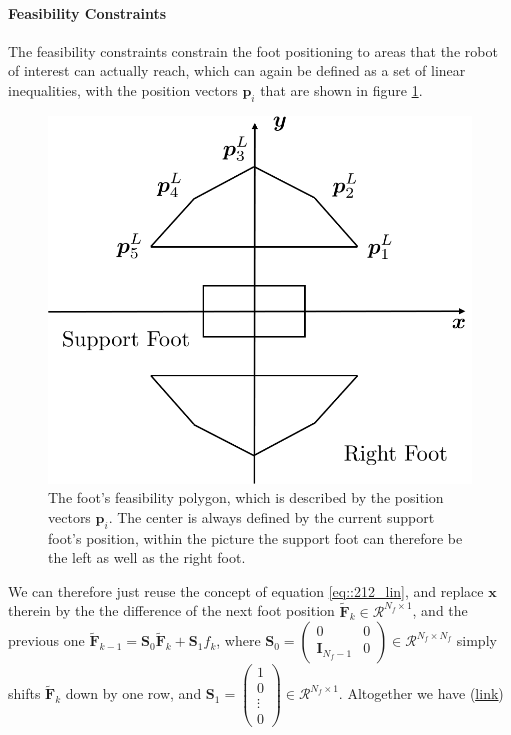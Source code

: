 \paragraph{Feasibility Constraints}
The feasibility constraints constrain the foot positioning to areas that the robot of interest can actually reach, which can again be defined as a set of linear inequalities, with the position vectors $\bm{p}_i$ that are shown in figure \ref{fig::212_foot_feasibility}. 
\begin{figure}[h!]
	\centering
	\includegraphics[scale=.5]{chapters/02_background/img/foot_constraints.png}
	\caption{The foot's feasibility polygon, which is described by the position vectors $\bm{p}_i$. The center is always defined by the current support foot's position, within the picture the support foot can therefore be the left as well as the right foot.}
	\label{fig::212_foot_feasibility}
\end{figure}
We can therefore just reuse the concept of equation \ref{eq::212_lin}, and replace $\bm{x}$ therein by the the difference of the next foot position $\tilde{\bm{F}}_{k}\in\mathcal{R}^{N_f\times1}$, and the previous one $\tilde{\bm{F}}_{k-1} = \bm{S}_0\tilde{\bm{F}}_{k} + \bm{S}_1f_k$, where $\bm{S}_0 = \begin{pmatrix}0 & 0 \\ \textbf{I}_{N_f-1} & 0
\end{pmatrix}\in\mathcal{R}^{N_f\times N_f}$ simply shifts $\tilde{\bm{F}}_{k}$ down by one row, and $\bm{S}_1 = \begin{pmatrix}
1 \\ 0 \\ \vdots \\ 0
\end{pmatrix}\in\mathcal{R}^{N_f\times1}$. Altogether we have (\href{https://github.com/mhubii/nmpc_pattern_generator/blob/dc1f5a9366cbbbf76f1b02cada642f6ac9a04c89/libs/pattern_generator/src/base_generator.cpp#L1061}{\underline{link}})
